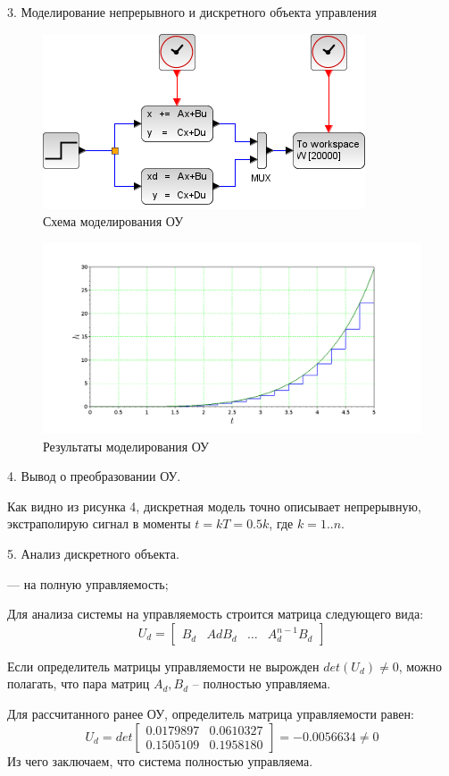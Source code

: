 \documentclass[a4paper,14pt]{extreport}
\begin{document}
	3. Моделирование непрерывного и дискретного объекта управления
	
	\begin{figure}[H]
		\center\includegraphics[width=0.5\linewidth]{model_1.png}
		\caption{Схема моделирования ОУ}
		\label{fig:scr1}
	\end{figure}
	
	\begin{figure}[H]
		\center\includegraphics[width=0.7\linewidth]{model_1_res.png}
		\caption{Результаты моделирования ОУ}
		\label{fig:scr1}
	\end{figure}
	
	4. Вывод о преобразовании ОУ.
	
	Как видно из рисунка 4, дискретная модель точно описывает непрерывную, экстраполирую сигнал в моменты $t = kT = 0.5k$, где $k = 1..n$.
	
	5. Анализ дискретного объекта.
	
	— на полную управляемость;
	
	Для анализа системы на управляемость строится матрица следующего вида:
	\begin{equation}
	U_d =
	\begin{bmatrix}
	B_d & Ad B_d & \dots & A_d^{n-1} B_d
	\end{bmatrix}
	\end{equation}
	
	Если определитель матрицы управляемости не вырожден $det(U_d) \ne 0$, можно полагать, что пара матриц $A_d, B_d$ -- полностью управляема.
	
	Для рассчитанного ранее ОУ, определитель матрица управляемости равен:
	\begin{equation}
	U_d =det
	\begin{bmatrix}
	0.0179897    &0.0610327  \\
	0.1505109    &0.1958180
	\end{bmatrix}
	=- 0.0056634  \ne 0
	\end{equation}
	Из чего заключаем, что система полностью управляема.
	
\end{document}
